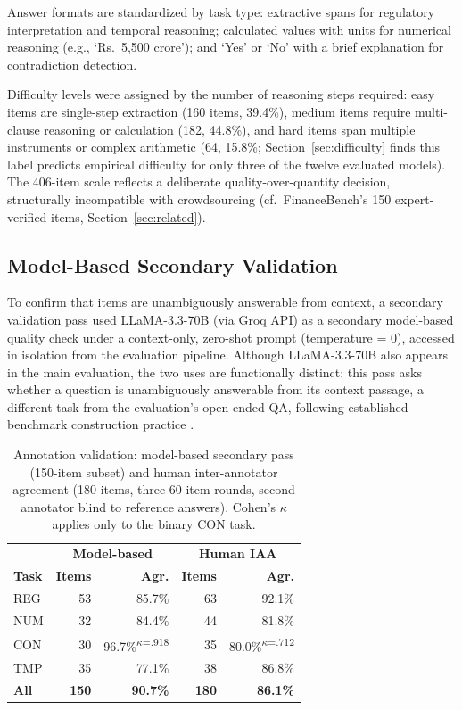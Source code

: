 Answer formats are standardized by task type: extractive spans for regulatory interpretation and
temporal reasoning; calculated values with units for numerical reasoning (e.g., `Rs.~5,500 crore');
and `Yes' or `No' with a brief explanation for contradiction detection.

Difficulty levels were assigned by the number of reasoning steps required: easy items are
single-step extraction (160 items, 39.4\%), medium items require multi-clause reasoning or
calculation (182, 44.8\%), and hard items span multiple instruments or complex arithmetic (64,
15.8\%; Section~\ref{sec:difficulty} finds this label predicts empirical difficulty for only three
of the twelve evaluated models). The 406-item scale reflects a deliberate quality-over-quantity
decision, structurally incompatible with crowdsourcing (cf.\ FinanceBench's 150 expert-verified
items, Section~\ref{sec:related}).

\subsection{Model-Based Secondary Validation}

To confirm that items are unambiguously answerable from context, a secondary validation pass used
LLaMA-3.3-70B (via Groq API) as a secondary model-based quality check under a context-only, zero-shot
prompt (temperature = 0), accessed in isolation from the evaluation pipeline. Although LLaMA-3.3-70B
also appears in the main evaluation, the two uses are functionally distinct: this pass asks whether a
question is unambiguously answerable from its context passage, a different task from the
evaluation's open-ended QA, following established benchmark construction practice
\citep{islam2023financebench, hendrycks2021cuad}.

\begin{table}[t]
\centering\small
\begin{tabular}{lrrrr}
\toprule
 & \multicolumn{2}{c}{\textbf{Model-based}} & \multicolumn{2}{c}{\textbf{Human IAA}} \\
\textbf{Task} & \textbf{Items} & \textbf{Agr.} & \textbf{Items} & \textbf{Agr.} \\
\midrule
REG & 53 & 85.7\% & 63 & 92.1\% \\
NUM & 32 & 84.4\% & 44 & 81.8\% \\
CON & 30 & 96.7\%\textsuperscript{$\kappa$=.918} & 35 & 80.0\%\textsuperscript{$\kappa$=.712} \\
TMP & 35 & 77.1\% & 38 & 86.8\% \\
\midrule
\textbf{All} & \textbf{150} & \textbf{90.7\%} & \textbf{180} & \textbf{86.1\%} \\
\bottomrule
\end{tabular}
\caption{Annotation validation: model-based secondary pass (150-item subset) and human
inter-annotator agreement (180 items, three 60-item rounds, second annotator blind to reference
answers). Cohen's $\kappa$ applies only to the binary CON task.}
\label{tab:validation}
\end{table}

